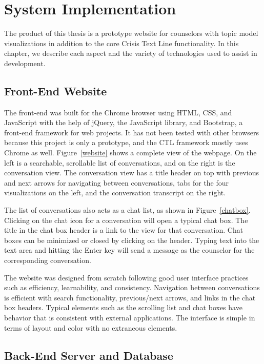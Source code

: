 \chapter{System Implementation}

The product of this thesis is a prototype website for counselors with topic model visualizations in addition to the core Crisis Text Line functionality. In this chapter, we describe each aspect and the variety of technologies used to assist in development.

\section{Front-End Website}

The front-end was built for the Chrome browser using HTML, CSS, and JavaScript with the help of jQuery, the JavaScript library, and Bootstrap, a front-end framework for web projects. It has not been tested with other browsers because this project is only a prototype, and the CTL framework mostly uses Chrome as well. Figure~\ref{website} shows a complete view of the webpage. On the left is a searchable, scrollable list of conversations, and on the right is the conversation view. The conversation view has a title header on top with previous and next arrows for navigating between conversations, tabs for the four visualizations on the left, and the conversation transcript on the right.

The list of conversations also acts as a chat list, as shown in Figure~\ref{chatbox}. Clicking on the chat icon for a conversation will open a typical chat box. The title in the chat box header is a link to the view for that conversation. Chat boxes can be minimized or closed by clicking on the header. Typing text into the text area and hitting the Enter key will send a message as the counselor for the corresponding conversation.

The website was designed from scratch following good user interface practices such as efficiency, learnability, and consistency. Navigation between conversations is efficient with search functionality, previous/next arrows, and links in the chat box headers. Typical elements such as the scrolling list and chat boxes have behavior that is consistent with external applications. The interface is simple in terms of layout and color with no extraneous elements.

\section{Back-End Server and Database}

